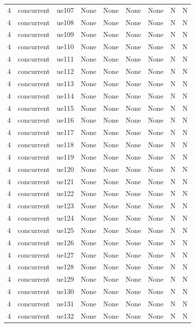 \begin{table}[ht]
\begin{tabular}{|c|c|c|c|c|c|c|c|c|}
4 & concurrent & ue107 & None & None & None & None & N & N \\
4 & concurrent & ue108 & None & None & None & None & N & N \\
4 & concurrent & ue109 & None & None & None & None & N & N \\
4 & concurrent & ue110 & None & None & None & None & N & N \\
4 & concurrent & ue111 & None & None & None & None & N & N \\
4 & concurrent & ue112 & None & None & None & None & N & N \\
4 & concurrent & ue113 & None & None & None & None & N & N \\
4 & concurrent & ue114 & None & None & None & None & N & N \\
4 & concurrent & ue115 & None & None & None & None & N & N \\
4 & concurrent & ue116 & None & None & None & None & N & N \\
4 & concurrent & ue117 & None & None & None & None & N & N \\
4 & concurrent & ue118 & None & None & None & None & N & N \\
4 & concurrent & ue119 & None & None & None & None & N & N \\
4 & concurrent & ue120 & None & None & None & None & N & N \\
4 & concurrent & ue121 & None & None & None & None & N & N \\
4 & concurrent & ue122 & None & None & None & None & N & N \\
4 & concurrent & ue123 & None & None & None & None & N & N \\
4 & concurrent & ue124 & None & None & None & None & N & N \\
4 & concurrent & ue125 & None & None & None & None & N & N \\
4 & concurrent & ue126 & None & None & None & None & N & N \\
4 & concurrent & ue127 & None & None & None & None & N & N \\
4 & concurrent & ue128 & None & None & None & None & N & N \\
4 & concurrent & ue129 & None & None & None & None & N & N \\
4 & concurrent & ue130 & None & None & None & None & N & N \\
4 & concurrent & ue131 & None & None & None & None & N & N \\
4 & concurrent & ue132 & None & None & None & None & N & N \\

\end{tabular}
\end{table}
